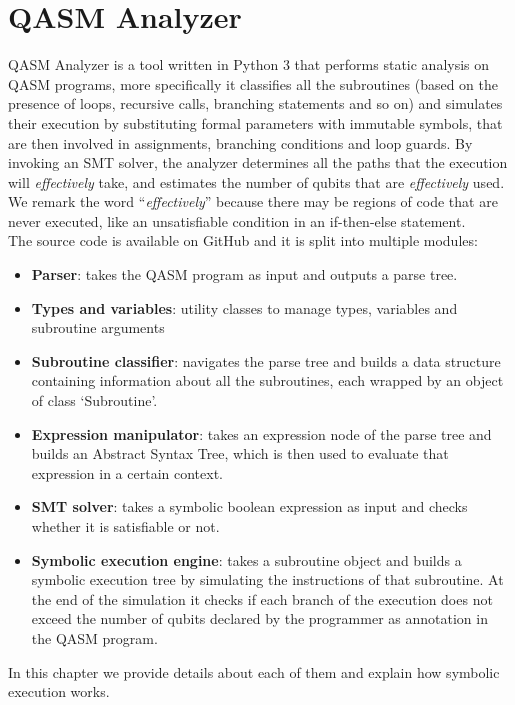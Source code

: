 \documentclass[12pt,a4paper]{report}
\theoremstyle{definition}
\theoremstyle{definition}
\theoremstyle{definition}
\begin{document}
\chapter{QASM Analyzer}
QASM Analyzer is a tool written in Python 3 that performs static analysis on QASM programs, more specifically it classifies all the subroutines (based on the presence of loops, recursive calls, branching statements and so on) and simulates their execution by substituting formal parameters with immutable symbols, that are then involved in assignments, branching conditions and loop guards. By invoking an SMT solver, the analyzer determines all the paths that the execution will \textit{effectively} take, and estimates the number of qubits that are \textit{effectively} used. We remark the word ``\textit{effectively}'' because there may be regions of code that are never executed, like an unsatisfiable condition in an if-then-else statement.\\
The source code is available on GitHub and it is split into multiple modules:
\begin{itemize}
    \itemsep 0em
    \item \textbf{Parser}: takes the QASM program as input and outputs a parse tree.
    \item \textbf{Types and variables}: utility classes to manage types, variables and subroutine arguments
    \item \textbf{Subroutine classifier}: navigates the parse tree and builds a data structure containing information about all the subroutines, each wrapped by an object of class `Subroutine'.
    \item \textbf{Expression manipulator}: takes an expression node of the parse tree and builds an Abstract Syntax Tree, which is then used to evaluate that expression in a certain context.
    \item \textbf{SMT solver}: takes a symbolic boolean expression as input and checks whether it is satisfiable or not.
    \item \textbf{Symbolic execution engine}: takes a subroutine object and builds a symbolic execution tree by simulating the instructions of that subroutine. At the end of the simulation it checks if each branch of the execution does not exceed the number of qubits declared by the programmer as annotation in the QASM program.
\end{itemize}
In this chapter we provide details about each of them and explain how symbolic execution works.
\end{document}
